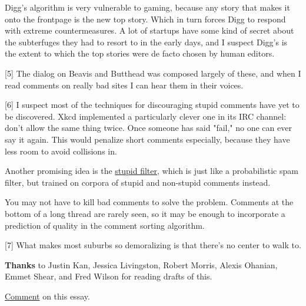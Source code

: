 Digg's algorithm is very vulnerable to
                  gaming, because any story that makes it onto the frontpage is
                  the new top story. Which in turn forces Digg to respond with
                  extreme countermeasures. A lot of startups have some kind of
                  secret about the subterfuges they had to resort to in the
                  early days, and I suspect Digg's is the extent to which the
                  top stories were de facto chosen by human editors.

[5] The dialog on Beavis and Butthead was composed largely of
                  these, and when I read comments on really bad sites I can hear
                  them in their voices.

[6] I suspect most of the techniques for discouraging stupid
                  comments have yet to be discovered. Xkcd implemented a
                  particularly clever one in its IRC channel: don't allow the
                  same thing twice. Once someone has said "fail," no one can
                  ever say it again. This would penalize short comments
                  especially, because they have less room to avoid collisions
                  in.

Another promising idea is the
                  \href{http://stupidfilter.org}{stupid filter}, which is
                  just like a probabilistic spam filter, but trained on corpora
                  of stupid and non-stupid comments instead.

You may
                  not have to kill bad comments to solve the problem. Comments
                  at the bottom of a long thread are rarely seen, so it may be
                  enough to incorporate a prediction of quality in the comment
                  sorting algorithm.

[7] What makes most suburbs so demoralizing is that there's no
                  center to walk to.


                  \textbf{Thanks} to Justin Kan, Jessica Livingston, Robert
                  Morris, Alexis Ohanian, Emmet Shear, and Fred Wilson for
                  reading drafts of this.


                  \href{http://news.ycombinator.com/item?id=495053}{Comment}
                  on this essay.




              
            
          
            
              
                


                  
              
            
          
